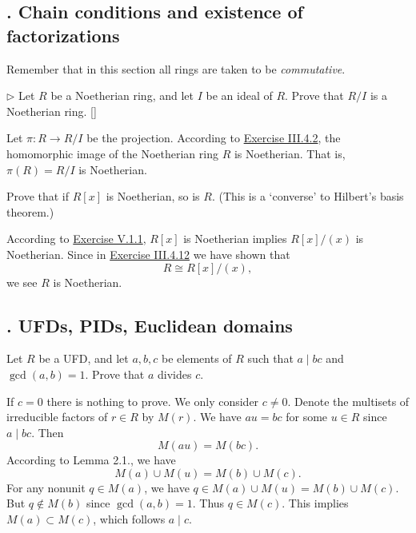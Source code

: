 \documentclass[12pt,letterpaper,boxed]{hmcpset}
\begin{document}
\subsection{. Chain conditions and existence of factorizations}
Remember that in this section all rings are taken to be \emph{commutative}.

\hypertarget{Exercise V.1.1}{}
\begin{problem}[1.1]
	$\triangleright$ Let $R$ be a Noetherian ring, and let $I$ be an ideal of $R$. Prove that $R / I$ is a Noetherian ring. []
\end{problem}
\begin{solution}
	Let $\pi:R\to R / I$ be the projection. According to \hyperlink{Exercise III.4.2}{Exercise III.4.2}, the homomorphic image of the Noetherian ring $R$ is Noetherian. That is, $\pi(R)=R / I$ is Noetherian.
\end{solution}

\begin{problem}[1.2]
Prove that if $R[x]$ is Noetherian, so is $R$. (This is a `converse' to Hilbert's basis theorem.)
\end{problem}
\begin{solution}
According to \hyperlink{Exercise V.1.1}{Exercise V.1.1}, $R[x]$ is Noetherian implies $R\left[x\right]/\left(x\right)$ is Noetherian. Since in \hyperlink{Exercise III.4.12}{Exercise III.4.12} we have shown that
\[
R\cong R\left[x\right]/\left(x\right),
\]
we see $R$ is Noetherian.
\end{solution}

\subsection{. UFDs, PIDs, Euclidean domains}

\begin{problem}[2.2]
Let $R$ be a UFD, and let $a,b,c$ be elements of $R$ such that $a\mid bc$ and $\gcd(a,b)=1$. Prove that $a$ divides $c$.
\end{problem}
\begin{solution}
If $c=0$ there is nothing to prove. We only consider $c\neq 0$.
Denote the multisets of irreducible factors of $r\in R$ by $M(r)$. We have $au=bc$ for some $u\in R$ since $a\mid bc$. Then
\[
M(au)=M(bc).
\]
According to Lemma 2.1., we have 
\[
M(a)\cup M(u)=M(b)\cup M(c).
\]
For any nonunit $q\in M(a)$, we have $q\in M(a)\cup M(u)=M(b)\cup M(c)$. But $q\notin M(b)$ since $\gcd(a,b)=1$. Thus $q\in M(c)$. This implies $M(a)\subset M(c)$, which follows $a\mid c$.
\end{solution}
\end{document}
